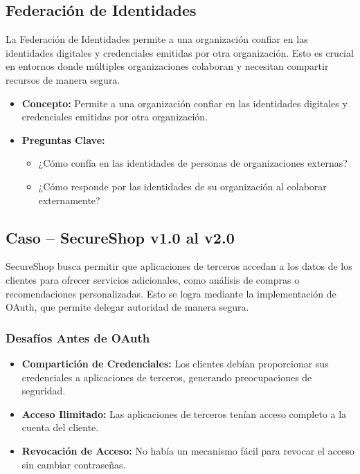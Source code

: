 \subsection{Federación de Identidades}

La Federación de Identidades permite a una organización confiar en las identidades digitales y credenciales emitidas por otra organización. Esto es crucial en entornos donde múltiples organizaciones colaboran y necesitan compartir recursos de manera segura.

\begin{itemize}
    \item \textbf{Concepto:} Permite a una organización confiar en las identidades digitales y credenciales emitidas por otra organización.
    \item \textbf{Preguntas Clave:}
    \begin{itemize}
        \item ¿Cómo confía en las identidades de personas de organizaciones externas?
        \item ¿Cómo responde por las identidades de su organización al colaborar externamente?
    \end{itemize}
\end{itemize}

\subsection{Caso – SecureShop v1.0 al v2.0}

SecureShop busca permitir que aplicaciones de terceros accedan a los datos de los clientes para ofrecer servicios adicionales, como análisis de compras o recomendaciones personalizadas. Esto se logra mediante la implementación de OAuth, que permite delegar autoridad de manera segura.

\subsubsection{Desafíos Antes de OAuth}

\begin{itemize}
    \item \textbf{Compartición de Credenciales:} Los clientes debían proporcionar sus credenciales a aplicaciones de terceros, generando preocupaciones de seguridad.
    \item \textbf{Acceso Ilimitado:} Las aplicaciones de terceros tenían acceso completo a la cuenta del cliente.
    \item \textbf{Revocación de Acceso:} No había un mecanismo fácil para revocar el acceso sin cambiar contraseñas.
\end{itemize}

